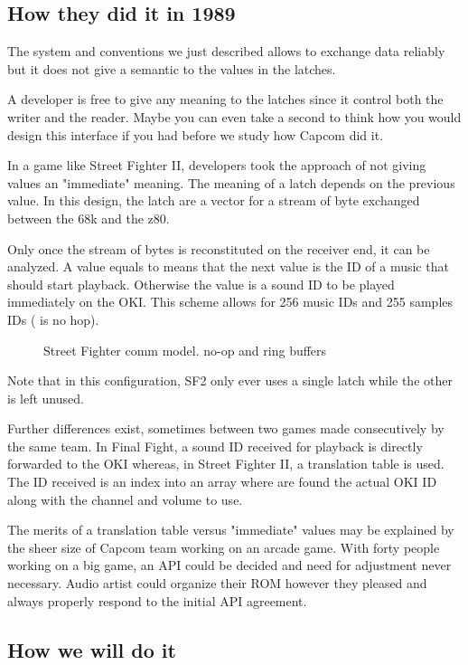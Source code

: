 \subsection{How they did it in 1989}
The system and conventions we just described allows to exchange data reliably but it does not give a semantic to the values in the latches. 

A developer is free to give any meaning to the latches since it control both the writer and the reader. Maybe you can even take a second to think how you would design this interface if you had before we study how Capcom did it.

In a game like Street Fighter II, developers took the approach of not giving values an "immediate" meaning. The meaning of a latch depends on the previous value. In this design, the latch are a vector for a stream of byte exchanged between the 68k and the z80.




Only once the stream of bytes is reconstituted on the receiver end, it can be analyzed. A value equals to  means that the next value is the ID of a music that should start playback. Otherwise the value is a sound ID to be played immediately on the OKI. This scheme allows for 256 music IDs and 255 samples IDs ( is no hop).

 \begin{figure}[H]
\caption*{Street Fighter comm model.  no-op and ring buffers}
\end{figure}

Note that in this configuration, SF2 only ever uses a single latch while the other is left unused.

Further differences exist, sometimes between two games made consecutively by the same team. In Final Fight, a sound ID received for playback is directly forwarded to the OKI whereas, in Street Fighter II, a translation table is used. The ID received is an index into an array where are found the actual OKI ID along with the channel and volume to use.

The merits of a translation table versus "immediate" values may be explained by the sheer size of Capcom team working on an arcade game. With forty people working on a big game, an API could be decided and need for adjustment never necessary. Audio artist could organize their ROM however they pleased and always properly respond to the initial API agreement.


\subsection{How we will do it}

